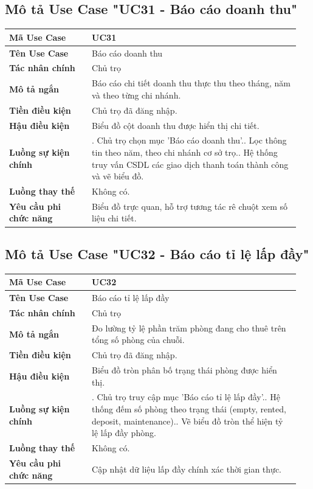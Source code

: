 \documentclass[a4paper,oneside]{report}
\begin{document}
\subsection{Mô tả Use Case "UC31 - Báo cáo doanh thu"}

\begin{longtable}[]{@{}>{\RaggedRight\arraybackslash}p{0.27\linewidth}>{\RaggedRight\arraybackslash}p{0.68\linewidth}@{}}
\toprule
\textbf{Mã Use Case} & UC31\tabularnewline
\midrule
\endhead
\textbf{Tên Use Case} & Báo cáo doanh thu\tabularnewline
\textbf{Tác nhân chính} & Chủ trọ\tabularnewline
\textbf{Mô tả ngắn} & Báo cáo chi tiết doanh thu thực thu theo tháng,
năm và theo từng chi nhánh.\tabularnewline
\textbf{Tiền điều kiện} & Chủ trọ đã đăng nhập.\tabularnewline
\textbf{Hậu điều kiện} & Biểu đồ cột doanh thu được hiển thị chi
tiết.\tabularnewline
\textbf{Luồng sự kiện chính} & 1. Chủ trọ chọn mục
'Báo cáo doanh thu'.\newline 2. Lọc thông tin theo năm, theo chi
nhánh cơ sở trọ.\newline 3. Hệ thống truy vấn CSDL các giao dịch
thanh toán thành công và vẽ biểu đồ.\tabularnewline
\textbf{Luồng thay thế} & Không có.\tabularnewline
\textbf{Yêu cầu phi chức năng} & Biểu đồ trực quan, hỗ trợ tương tác rê
chuột xem số liệu chi tiết.\tabularnewline
\bottomrule
\end{longtable}

\subsection{Mô tả Use Case "UC32 - Báo cáo tỉ lệ lấp đầy"}

\begin{longtable}[]{@{}>{\RaggedRight\arraybackslash}p{0.27\linewidth}>{\RaggedRight\arraybackslash}p{0.68\linewidth}@{}}
\toprule
\textbf{Mã Use Case} & UC32\tabularnewline
\midrule
\endhead
\textbf{Tên Use Case} & Báo cáo tỉ lệ lấp đầy\tabularnewline
\textbf{Tác nhân chính} & Chủ trọ\tabularnewline
\textbf{Mô tả ngắn} & Đo lường tỷ lệ phần trăm phòng đang cho thuê trên
tổng số phòng của chuỗi.\tabularnewline
\textbf{Tiền điều kiện} & Chủ trọ đã đăng nhập.\tabularnewline
\textbf{Hậu điều kiện} & Biểu đồ tròn phân bố trạng thái phòng được hiển
thị.\tabularnewline
\textbf{Luồng sự kiện chính} & 1. Chủ trọ truy cập
mục 'Báo cáo tỉ lệ lấp đầy'.\newline 2. Hệ thống đếm số phòng theo
trạng thái (empty, rented, deposit, maintenance).\newline 3. Vẽ
biểu đồ tròn thể hiện tỷ lệ lấp đầy phòng.\tabularnewline
\textbf{Luồng thay thế} & Không có.\tabularnewline
\textbf{Yêu cầu phi chức năng} & Cập nhật dữ liệu lấp đầy chính xác thời
gian thực.\tabularnewline
\bottomrule
\end{longtable}
\end{document}
